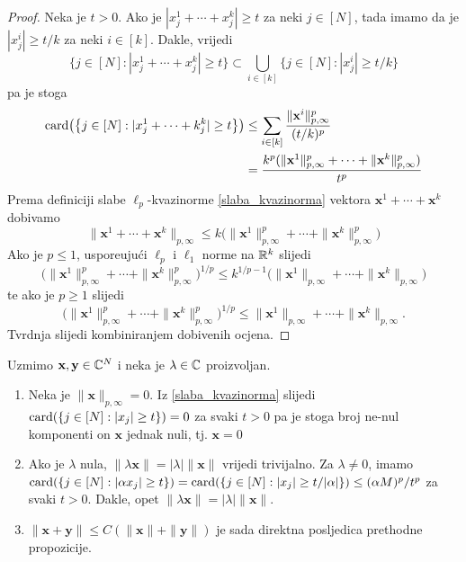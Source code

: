 \documentclass[a4paper,twoside,12pt]{memoir} %
\newcommand{\vect}[1]{\mathbf{#1}}
\renewcommand{\vec}{\vect}
\newcommand{\card}{\text{\normalfont{card}}}
\begin{document}
\begin{proof}
    Neka je $t>0$. Ako je $|x_j^1+\cdots+x_j^k|\geq t$ za neki $j\in [N]$, tada imamo da je $|x_j^i|\geq t/k$ za neki $i \in [k]$. Dakle, vrijedi
    \begin{equation*}
        \big\{ j\in [N]:|x_j^1+\cdots+x_j^k| \geq t \big\} \subset \bigcup\limits_{i\in [k]} \big \{ j \in [N] : |x_j^i| \geq t/k \big \}
    \end{equation*}
    pa je stoga
    \begin{align*}
        \card\big( \big\{ j\in [N] : |x_j^1+\cdots+k_j^k| \geq t \big\}\big)&\leq\sum\limits_{i\in [k]}\frac{\|\vec{x}^i\|^p_{p, \infty}}{(t/k)^p} \\ 
                                                                            &= \frac{k^p(\|\vec{x}^1\|^p_{p, \infty}+\cdots + \|\vec{x}^k\|^p_{p, \infty})}{t^p}
    \end{align*}
    Prema definiciji slabe $\ell_p$-kvazinorme \eqref{slaba_kvazinorma} vektora $\vec{x}^1+\cdots+\vec{x}^k$ dobivamo
    \begin{equation*}
        \|\vec{x}^1+\cdots+\vec{x}^k\|_{p, \infty}\leq k\big(\|\vec{x}^1\|^p_{p,\infty}+ \cdots +\|\vec{x}^k\|^p_{p,\infty}\big) 
    \end{equation*}
    Ako je $p \leq 1$, uspore\dj uju\'ci $\ell_p$ i $\ell_1$ norme na $\mathbb{R}^k$ slijedi
    \begin{equation*}
        \big(\|\vec{x}^1\|^p_{p,\infty}+ \cdots +\|\vec{x}^k\|^p_{p,\infty}\big)^{1/p} \leq k^{1/p-1}\big(\|\vec{x}^1\|_{p,\infty}+ \cdots +\|\vec{x}^k\|_{p,\infty}\big)
    \end{equation*}
    te ako je $p \geq 1$ slijedi
    \begin{equation*}
        \big(\|\vec{x}^1\|^p_{p,\infty}+ \cdots +\|\vec{x}^k\|^p_{p,\infty}\big)^{1/p} \leq \|\vec{x}^1\|_{p,\infty}+ \cdots +\|\vec{x}^k\|_{p,\infty}.
    \end{equation*}
    Tvrdnja slijedi kombiniranjem dobivenih ocjena.
\end{proof}

\noindent
Uzmimo $\vec{x}, \vec{y} \in \C^N$ i neka je $\lambda \in \mathbb{C}$ proizvoljan.

\begin{enumerate}
    \item Neka je $\|\vec{x}\|_{p, \infty}=0$. Iz \eqref{slaba_kvazinorma} slijedi $ \card(\{j \in [N]: |x_j| \geq t\}) = 0$ za svaki $t > 0$ pa je stoga broj ne-nul komponenti on $\vec{x}$ jednak nuli, tj. $\vec{x}=0$ 
    \item Ako je $\lambda$ nula, $\|\lambda \vec{x}\| = | \lambda | \| \vec{x} \|$ vrijedi trivijalno. Za $\lambda \neq 0$, imamo \\
        $\card(\{ j \in [N]: |\alpha x_j| \geq t \}) = \card(\{ j \in [N]: |x_j| \geq t/|\alpha| \})\leq (\alpha M)^p/t^p$ za svaki $t>0$. Dakle, opet $\|\lambda \vec{x}\| = | \lambda | \| \vec{x} \|$.
    \item $\|\vec{x}+\vec{y}\|\leq C(\|\vec{x}\|+\|\vec{y}\|)$ je sada direktna posljedica prethodne propozicije.
\end{enumerate}
\end{document}
